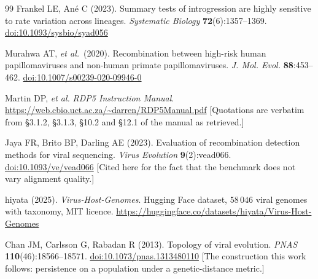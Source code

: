 \documentclass[11pt,a4paper]{article}
\theoremstyle{definition}
\theoremstyle{remark}
\begin{document}
\begin{thebibliography}{99}
 Frankel LE, An\'e C (2023). Summary tests of introgression
are highly sensitive to rate variation across lineages. \emph{Systematic Biology}
\textbf{72}(6):1357--1369.
\href{https://doi.org/10.1093/sysbio/syad056}{doi:10.1093/sysbio/syad056}

 Murahwa AT, \emph{et al.}\ (2020). Recombination between
high-risk human papillomaviruses and non-human primate papillomaviruses.
\emph{J. Mol. Evol.} \textbf{88}:453--462.
\href{https://doi.org/10.1007/s00239-020-09946-0}{doi:10.1007/s00239-020-09946-0}

 Martin DP, \emph{et al.} \emph{RDP5 Instruction Manual}.
\url{https://web.cbio.uct.ac.za/~darren/RDP5Manual.pdf} [Quotations are verbatim
from §3.1.2, §3.1.3, §10.2 and §12.1 of the manual as retrieved.]

 Jaya FR, Brito BP, Darling AE (2023). Evaluation of
recombination detection methods for viral sequencing. \emph{Virus Evolution}
\textbf{9}(2):vead066.
\href{https://doi.org/10.1093/ve/vead066}{doi:10.1093/ve/vead066}
[Cited here for the fact that the benchmark does not vary alignment quality.]

 hiyata (2025). \emph{Virus-Host-Genomes}. Hugging Face dataset,
$58\,046$ viral genomes with taxonomy, MIT licence.
\url{https://huggingface.co/datasets/hiyata/Virus-Host-Genomes}

 Chan JM, Carlsson G, Rabadan R (2013). Topology of viral
evolution. \emph{PNAS} \textbf{110}(46):18566--18571.
\href{https://doi.org/10.1073/pnas.1313480110}{doi:10.1073/pnas.1313480110}
[The construction this work follows: persistence on a population under a
genetic-distance metric.]

\end{thebibliography}
\end{document}
